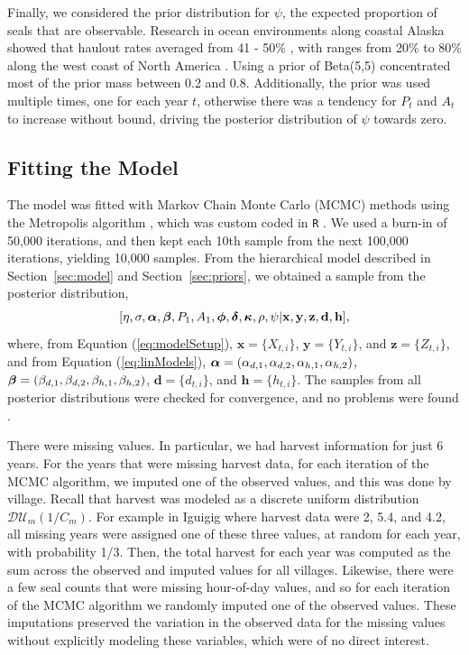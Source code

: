 \documentclass[12pt, titlepage]{article}\usepackage[]{graphicx}\usepackage[]{color}
\newcommand{\bx}{\ensuremath{\mathbf{x}}}
\newcommand{\bz}{\ensuremath{\mathbf{z}}}
\def\bd{\mathbf{d}}
\def\bh{\mathbf{h}}
\def\bx{\mathbf{x}}
\def\by{\mathbf{y}}
\def\bz{\mathbf{z}}
\def\balpha{\mbox{\boldmath $\alpha$}}
\def\bbeta{\mbox{\boldmath $\beta$}}
\def\bdelta{\mbox{\boldmath $\delta$}}
\def\bphi{\mbox{\boldmath $\phi$}}
\def\bkappa{\mbox{\boldmath $\kappa$}}
\begin{document}
Finally, we considered the prior distribution for $\psi$, the expected proportion of seals that are observable.  Research in ocean environments along coastal Alaska showed that haulout rates averaged from 41 - 50\% \citep{Pitc:McAll:move:1981}, with ranges from 20\% to 80\% along the west coast of North America \citep{Sull:beha:1979,Hube:Jeff:Brow:Delo:Vanb:corr:2001,Simp:With:Cesa:Bove:stab:2003,Ver:Lond:Bove:fast:2010}. Using a prior of Beta(5,5) concentrated most of the prior mass between 0.2 and 0.8.  Additionally, the prior was used multiple times, one for each year $t$, otherwise there was a tendency for $P_t$ and $A_t$ to increase without bound, driving the posterior distribution of $\psi$ towards zero.


\subsection{Fitting the Model}

The model was fitted with Markov Chain Monte Carlo (MCMC) methods using the Metropolis algorithm \citep{Metr:Rose:Rose:Tell:Tell:equa:1953}, which was custom coded in \texttt{R} \citep{R:Deve:Core:ALan:2016}. We used a burn-in of 50,000 iterations, and then kept each 10th sample from the next 100,000 iterations, yielding 10,000 samples.  From the hierarchical model described in Section~\ref{sec:model} and Section~\ref{sec:priors}, we obtained a sample from the posterior distribution,
%
\[
[\eta, \sigma, \balpha, \bbeta, P_1, A_1, \bphi, \bdelta, \bkappa, \rho, \psi | \bx, \by, \bz, \bd, \bh],
\]
where, from Equation (\ref{eq:modelSetup}), $\bx = \{X_{t,i}\}$, $\by = \{Y_{t,i}\}$, and $\bz = \{Z_{t,i}\}$, and from Equation (\ref{eq:linModels}), $\balpha = (\alpha_{d,1}, \alpha_{d,2}, \alpha_{h,1}, \alpha_{h,2})$, $\bbeta = (\beta_{d,1}, \beta_{d,2}, \beta_{h,1}, \beta_{h,2})$, $\bd = \{d_{t,i}\}$, and $\bh = \{h_{t,i}\}$.  The samples from all posterior distributions were checked for convergence, and no problems were found \citep{Jone:Hara:Caff:Neat:fixe:2006}.

There were missing values.  In particular, we had harvest information for just 6 years.  For the years that were missing harvest data, for each iteration of the MCMC algorithm, we imputed one of the observed values, and this was done by village.  Recall that harvest was modeled as a discrete uniform distribution $\mathcal{DU}_m(1/C_m)$. For example in Iguigig where harvest data were 2, 5.4, and 4.2, all missing years were assigned one of these three values, at random for each year, with probability 1/3.  Then, the total harvest for each year was computed as the sum across the observed and imputed values for all villages. Likewise, there were a few seal counts that were missing hour-of-day values, and so for each iteration of the MCMC algorithm we randomly imputed one of the observed values.  These imputations preserved the variation in the observed data for the missing values without explicitly modeling these variables, which were of no direct interest.
\end{document}
